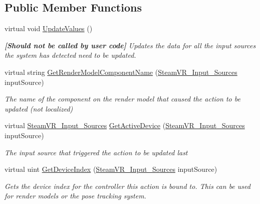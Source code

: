 \subsection*{Public Member Functions}
\begin{DoxyCompactItemize}
\item 
virtual void \mbox{\hyperlink{class_valve_1_1_v_r_1_1_steam_v_r___action___in_ac2e658d37dcdb843a0cff2e62cbd84cf}{Update\+Values}} ()
\begin{DoxyCompactList}\small\item\em {\bfseries{\mbox{[}Should not be called by user code\mbox{]}}} Updates the data for all the input sources the system has detected need to be updated. \end{DoxyCompactList}\item 
virtual string \mbox{\hyperlink{class_valve_1_1_v_r_1_1_steam_v_r___action___in_ad435fe38eac2d62d6ce217644a6586af}{Get\+Render\+Model\+Component\+Name}} (\mbox{\hyperlink{namespace_valve_1_1_v_r_a82e5bf501cc3aa155444ee3f0662853f}{Steam\+V\+R\+\_\+\+Input\+\_\+\+Sources}} input\+Source)
\begin{DoxyCompactList}\small\item\em The name of the component on the render model that caused the action to be updated (not localized) \end{DoxyCompactList}\item 
virtual \mbox{\hyperlink{namespace_valve_1_1_v_r_a82e5bf501cc3aa155444ee3f0662853f}{Steam\+V\+R\+\_\+\+Input\+\_\+\+Sources}} \mbox{\hyperlink{class_valve_1_1_v_r_1_1_steam_v_r___action___in_a2cf3c55c01761a091db3afb42a3d47f2}{Get\+Active\+Device}} (\mbox{\hyperlink{namespace_valve_1_1_v_r_a82e5bf501cc3aa155444ee3f0662853f}{Steam\+V\+R\+\_\+\+Input\+\_\+\+Sources}} input\+Source)
\begin{DoxyCompactList}\small\item\em The input source that triggered the action to be updated last \end{DoxyCompactList}\item 
virtual uint \mbox{\hyperlink{class_valve_1_1_v_r_1_1_steam_v_r___action___in_a21f1b8a683a6950f2e2cd1a2bbe42acc}{Get\+Device\+Index}} (\mbox{\hyperlink{namespace_valve_1_1_v_r_a82e5bf501cc3aa155444ee3f0662853f}{Steam\+V\+R\+\_\+\+Input\+\_\+\+Sources}} input\+Source)
\begin{DoxyCompactList}\small\item\em Gets the device index for the controller this action is bound to. This can be used for render models or the pose tracking system. \end{DoxyCompactList}\item 

\end{DoxyCompactItemize}
